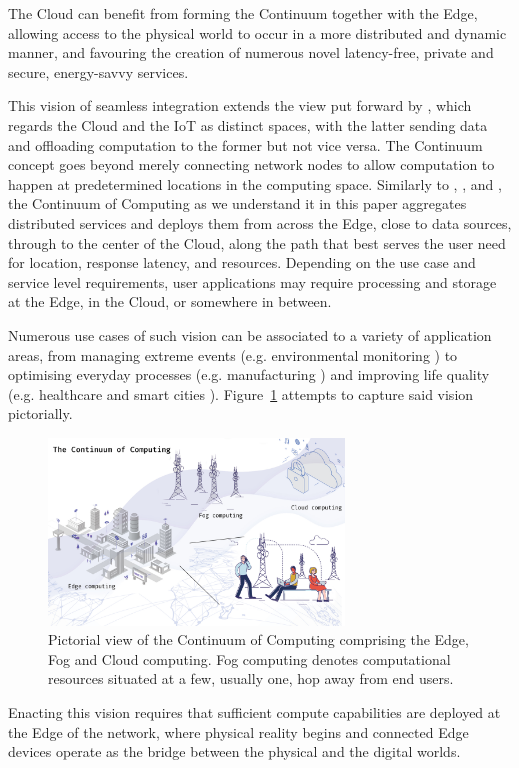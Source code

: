 The Cloud can benefit from forming the Continuum together with the Edge, allowing access to the physical world to occur in a more distributed and dynamic manner, and favouring the creation of numerous novel latency-free, private and secure, energy-savvy services. 

This vision of seamless integration extends the view put forward by \cite{botta2016integration}, which regards the Cloud and the IoT as distinct spaces, with the latter sending data and offloading computation to the former but not vice versa. The Continuum concept goes beyond merely connecting network nodes to allow computation to happen at predetermined locations in the computing space.
Similarly to \cite{latre2014fluid}, \cite{abdelbaky2017computing}, and \cite{beckman2020harnessing}, the Continuum of Computing as we understand it in this paper aggregates distributed services and deploys them from across the Edge, close to data sources, through to the center of the Cloud, along the path that best serves the user need for location, response latency, and resources.
Depending on the use case and service level requirements, user applications may require processing and storage at the Edge, in the Cloud, or somewhere in between.

Numerous use cases of such vision can be associated to a variety of application areas, from managing extreme events (e.g. environmental monitoring \cite{brzoza2016embedded}) to optimising everyday processes (e.g. manufacturing \cite{chen2018edge}) and improving life quality (e.g. healthcare \cite{pace2018edge} and smart cities \cite{he2017multitier}).
Figure~\ref{fig:continuum} attempts to capture said vision pictorially. 
\begin{figure}[ht]
\centering
\includegraphics[width=0.7\textwidth]{figures/continuum}
\caption{Pictorial view of the Continuum of Computing comprising the Edge, Fog and Cloud computing. Fog computing denotes computational resources situated at a few, usually one, hop away from end users.}
\label{fig:continuum}
\end{figure}
Enacting this vision requires that sufficient compute capabilities are deployed at the Edge of the network, where physical reality begins and connected Edge devices operate as the bridge between the physical and the digital worlds.

